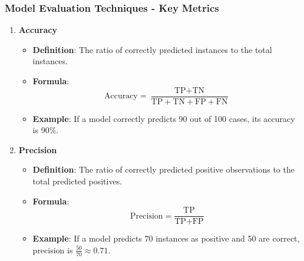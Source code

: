 \documentclass[aspectratio=169]{beamer}
\begin{document}
\begin{frame}[fragile]
    \frametitle{Model Evaluation Techniques - Key Metrics}
    \begin{enumerate}
        \item \textbf{Accuracy}
        \begin{itemize}
            \item \textbf{Definition}: The ratio of correctly predicted instances to the total instances.
            \item \textbf{Formula}:
            \begin{equation}
                \text{Accuracy} = \frac{\text{TP} + \text{TN}}{\text{TP} + \text{TN} + \text{FP} + \text{FN}}
            \end{equation}
            \item \textbf{Example}: If a model correctly predicts 90 out of 100 cases, its accuracy is 90\%.
        \end{itemize}

        \item \textbf{Precision}
        \begin{itemize}
            \item \textbf{Definition}: The ratio of correctly predicted positive observations to the total predicted positives.
            \item \textbf{Formula}:
            \begin{equation}
                \text{Precision} = \frac{\text{TP}}{\text{TP} + \text{FP}}
            \end{equation}
            \item \textbf{Example}: If a model predicts 70 instances as positive and 50 are correct, precision is \( \frac{50}{70} \approx 0.71 \).
        \end{itemize}
    \end{enumerate}
\end{frame}
\end{document}

